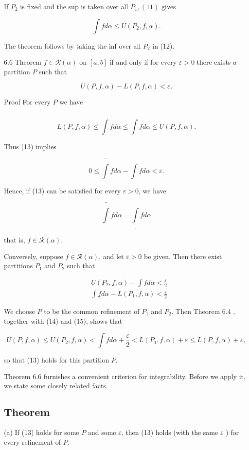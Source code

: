 \documentclass[10pt]{article}
\begin{document}
If $P_{2}$ is fixed and the sup is taken over all $P_{1},(11)$ gives

$$
\int f d \alpha \leq U\left(P_{2}, f, \alpha\right) .
$$

The theorem follows by taking the inf over all $P_{2}$ in (12).

6.6 Theorem $f \in \mathscr{R}(\alpha)$ on $[a, b]$ if and only if for every $\varepsilon>0$ there exists $a$ partition $P$ such that

$$
U(P, f, \alpha)-L(P, f, \alpha)<\varepsilon .
$$

Proof For every $P$ we have

$$
L(P, f, \alpha) \leq \int f d \alpha \leq \bar{\int} f d \alpha \leq U(P, f, \alpha) .
$$

Thus (13) implies

$$
0 \leq \bar{\int} f d \alpha-\int f d \alpha<\varepsilon .
$$

Hence, if (13) can be satisfied for every $\varepsilon>0$, we have

$$
\bar{\int} f d \alpha=\underline{\int} f d \alpha
$$

that is, $f \in \mathscr{R}(\alpha)$.

Conversely, suppose $f \in \mathscr{R}(\alpha)$, and let $\varepsilon>0$ be given. Then there exist partitions $P_{1}$ and $P_{2}$ such that

$$
\begin{aligned}
& U\left(P_{2}, f, \alpha\right)-\int f d \alpha<\frac{\varepsilon}{2} \\
& \int f d \alpha-L\left(P_{1}, f, \alpha\right)<\frac{\varepsilon}{2}
\end{aligned}
$$

We choose $P$ to be the common refinement of $P_{1}$ and $P_{2}$. Then Theorem 6.4 , together with (14) and (15), shows that

$$
U(P, f, \alpha) \leq U\left(P_{2}, f, \alpha\right)<\int f d \alpha+\frac{\varepsilon}{2}<L\left(P_{1}, f, \alpha\right)+\varepsilon \leq L(P, f, \alpha)+\varepsilon,
$$

so that (13) holds for this partition $P$.

Theorem 6.6 furnishes a convenient criterion for integrability. Before we apply it, we state some closely related facts.

\subsection{Theorem}
(a) If (13) holds for some $P$ and some $\varepsilon$, then (13) holds (with the same $\varepsilon$ ) for every refinement of $P$.
\end{document}
